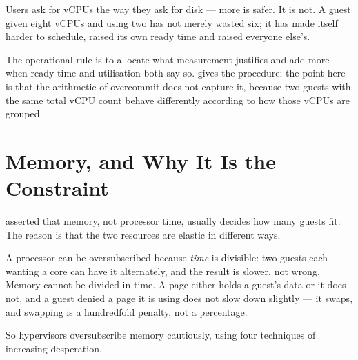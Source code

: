 \begin{alertbox}
Users ask for vCPUs the way they ask for disk --- more is safer. It is not. A
guest given eight vCPUs and using two has not merely wasted six; it has made
itself harder to schedule, raised its own ready time and raised everyone
else's.

\smallskip
The operational rule is to allocate what measurement justifies and add more
when ready time and utilisation both say so.  gives the
procedure; the point here is that the arithmetic of overcommit does not capture
it, because two guests with the same total vCPU count behave differently
according to how those vCPUs are grouped.
\end{alertbox}

\section{Memory, and Why It Is the Constraint}

 asserted that memory, not processor time, usually decides how many
guests fit. The reason is that the two resources are elastic in different ways.

A processor can be oversubscribed because \emph{time} is divisible: two guests
each wanting a core can have it alternately, and the result is slower, not
wrong. Memory cannot be divided in time. A page either holds a guest's data or
it does not, and a guest denied a page it is using does not slow down slightly
--- it swaps, and swapping is a hundredfold penalty, not a percentage.

So hypervisors oversubscribe memory cautiously, using four techniques of
increasing desperation.

